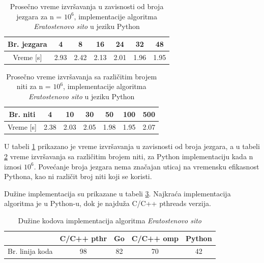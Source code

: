 \documentclass[12pt,oneside]{memoir}
\begin{document}
\begin{table}[H]
\begin{center}
\caption{Prosečno vreme izvršavanja  u zavisnosti od broja jezgara za n = $10^{6}$, implementacije algoritma \textit{Eratostenovo sito} u jeziku Python}
\begin{tabular}{||c||c|c|c|c|c|c||}
\hline
Br. jezgara &4  &8 &16 &24 & 32 &48 \\ \hline
Vreme [s]	&2.93		&2.42		&2.13 	& 2.01	&1.96 	&1.95\\ \hline  
\end{tabular}
\label{tab:prime11}
\end{center}
\end{table}

\begin{table}[H]
\begin{center}
\caption{Prosečno vreme izvršavanja  sa različitim brojem niti za n = $10^{6}$, implementacije algoritma \textit{Eratostenovo sito} u jeziku Python}
\begin{tabular}{||c||c|c|c|c|c|c||}
\hline
Br. niti &4 &10 &30 &50 &100 & 500  \\ \hline
Vreme [s]	&2.38		&2.03		&2.05	 	& 1.98	&1.95		&2.07\\ \hline
\end{tabular}
\label{tab:prime111}
\end{center}
\end{table}

U  tabeli \ref{tab:prime11} prikazano je vreme izvršavanja u zavisnosti od broja jezgara, a u tabeli \ref{tab:prime111} vreme izvršavanja sa različitim brojem niti, za Python implementaciju kada n iznosi $10^{6}$. Povećanje broja jezgara nema značajan uticaj na vremensku efikasnost Pythona, kao ni različit broj niti koji se koristi.

Dužine implementacija su prikazane u tabeli \ref{tab:prime2}. Najkraća implementacija algoritma je u Python-u, dok je najduža C/C++ pthreads verzija.

\begin{table}[H]
\begin{center}
\caption{Dužine kodova implementacija algoritma \textit{Eratostenovo sito}}
\begin{tabular}{|c|c|c|c|c|}
\hline
		&  C/C++ pthr	&Go 	& C/C++ omp & Python 	 \\ \hline
Br. linija koda&98		& 82	&70	&42		 \\ \hline
\end{tabular}
\label{tab:prime2}
\end{center}
\end{table}
\end{document}
